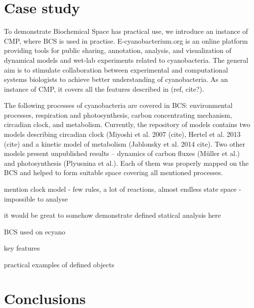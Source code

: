 \documentclass[12pt]{fithesis2}
\begin{document}
\chapter{Case study}

To demonstrate Biochemical Space has practical use, we introduce an instance of CMP, where BCS is used in practise. E-cyanobacterium.org is an online platform providing tools for public sharing, annotation, analysis, and visualization of dynamical models and wet-lab experiments related to cyanobacteria. The general aim is to stimulate collaboration between experimental and computational systems biologists to achieve better understanding of cyanobacteria. As an instance of CMP, it covers all the features described in (ref, cite?).

The following processes of cyanobacteria are covered in BCS: environmental processes, respiration and photosynthesis, carbon concentrating mechanism, circadian clock, and metabolism. Currently, the repository of models contains two models describing circadian clock (Miyoshi et al. 2007 (cite), Hertel et al. 2013 (cite) and a kinetic model of metabolism (Jablonsky et al. 2014 cite). Two other models present unpublished results -- dynamics of carbon fluxes (M\"{u}ller et al.) and photosynthesis (Plyusnina et al.). Each of them was properly mapped on the BCS and helped to form suitable space covering all mentioned processes.

mention clock model - few rules, a lot of reactions, almost endless state space - impossible to analyse

it would be great to somehow demonstrate defined statical analysis here

BCS used on ecyano

key features
 
practical examples of defined objects

\chapter{Conclusions}

\printbibliography
\end{document}
